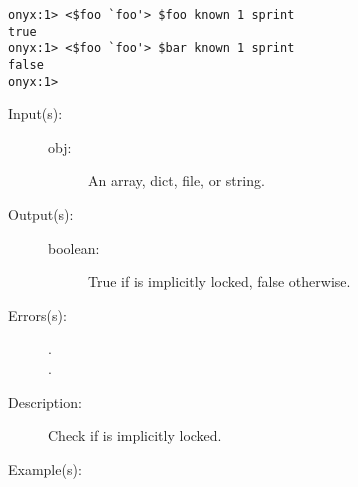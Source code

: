 \begin{description}
\begin{description}
\begin{verbatim}
onyx:1> <$foo `foo'> $foo known 1 sprint
true
onyx:1> <$foo `foo'> $bar known 1 sprint
false
onyx:1>
		\end{verbatim}
	\end{description}
\label{systemdict:lcheck}
\item[{\onyxop{obj}{lcheck}{boolean}}: ]
	\begin{description}\item[]
	\item[Input(s): ]
		\begin{description}\item[]
		\item[obj: ]
			An array, dict, file, or string.
		\end{description}
	\item[Output(s): ]
		\begin{description}\item[]
		\item[boolean: ]
			True if  is implicitly locked, false
			otherwise.
		\end{description}
	\item[Errors(s): ]
		\begin{description}\item[]
		\item[.]
		\item[.]
		\end{description}
	\item[Description: ]
		Check if  is implicitly locked.
	\item[Example(s): ]\begin{verbatim}


\end{verbatim}
\end{description}
\end{description}

